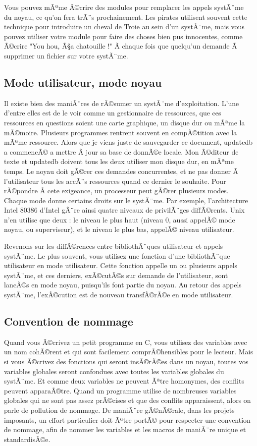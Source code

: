 \documentclass[11pt]{article}
\begin{document}
Vous pouvez mÃªme Ã©crire des modules pour remplacer les appels systÃ¨me du noyau, ce qu'on fera trÃ¨s prochainement. Les pirates utilisent souvent cette technique pour introduire un cheval de Troie au sein d'un systÃ¨me, mais vous pouvez utiliser votre module pour faire des choses bien pus innocentes, comme Ã©crire "You hou, Ã§a chatouille !" Ã  chaque fois que quelqu'un demande Ã  supprimer un fichier sur votre systÃ¨me.

\subsection*{Mode utilisateur, mode noyau}
\label{sec-5-3}

Il existe bien des maniÃ¨res de rÃ©sumer un systÃ¨me d'exploitation. L'une d'entre elles est de le voir comme un gestionnaire de ressources, que ces ressources en questions soient une carte graphique, un disque dur ou mÃªme la mÃ©moire. Plusieurs programmes rentrent souvent en compÃ©tition avec la mÃªme ressource. Alors que je viens juste de sauvegarder ce document, updatedb a commencÃ© a mettre Ã  jour sa base de donnÃ©e locale. Mon Ã©diteur de texte et updatedb doivent tous les deux utiliser mon disque dur, en mÃªme temps. Le noyau doit gÃ©rer ces demandes concurrentes, et ne pas donner Ã  l'utilisateur tous les accÃ¨s ressources quand ce dernier le souhaite. Pour rÃ©pondre Ã  cete exigeance, un processeur peut gÃ©rer plusieurs modes. Chaque mode donne certains droits sur le systÃ¨me. Par exemple, l'architecture Intel 80386 d'Intel gÃ¨re ainsi quatre niveaux de privilÃ¨ges diffÃ©rents. Unix n'en utilise que deux : le niveau le plus haut (niveau 0, aussi appelÃ© mode noyau, ou superviseur), et le niveau le plus bas, appelÃ© niveau utilisateur.

Revenons sur les diffÃ©rences entre bibliothÃ¨ques utilisateur et appels systÃ¨me. Le plus souvent, vous utilisez une fonction d'une bibliothÃ¨que utilisateur en mode utilisateur. Cette fonction appelle un ou plusieurs appels systÃ¨me, et ces derniers, exÃ©cutÃ©s sur demande de l'utilisateur, sont lancÃ©s en mode noyau, puisqu'ils font partie du noyau. Au retour des appels systÃ¨me, l'exÃ©cution est de nouveau transfÃ©rÃ©e en mode utilisateur.

\subsection*{Convention de nommage}
\label{sec-5-4}

Quand vous Ã©crivez un petit programme en C, vous utilisez des variables avec un nom cohÃ©rent et qui sont facilement comprÃ©hensibles pour le lecteur. Mais si vous Ã©crivez des fonctions qui seront insÃ©rÃ©es dans un noyau, toutes vos variables globales seront confondues avec toutes les variables globales du systÃ¨me. Et comme deux variables ne peuvent Ãªtre homonymes, des conflits peuvent apparaÃ®tre. Quand un programme utilise de nombreuses variables globales qui ne sont pas assez prÃ©cises et que des conflits apparaissent, alors on parle de pollution de nommage. De maniÃ¨re gÃ©nÃ©rale, dans les projets imposants, un effort particulier doit Ãªtre portÃ© pour respecter une convention de nommage, afin de nommer les variables et les macros de maniÃ¨re unique et standardisÃ©e.
\end{document}
